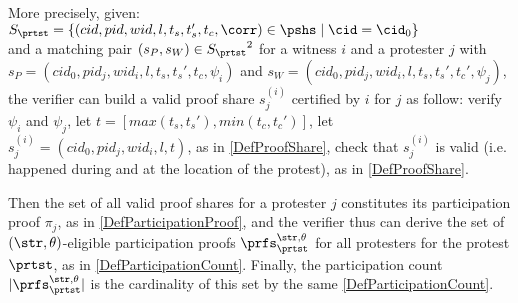 More precisely, given: \\
\(S_{\prtst} = \{ (cid, pid, wid, l, t_s, t_s', t_c, \corr) \in \pshs \mid \cid = \cid_0 \} \) \\
and a matching pair \((s_P, s_W) \in {S_{\prtst}}^2\) for a witness \(i\) and a protester \(j\)
with \(s_P = (cid_0, pid_j, wid_i, l, t_s, t_s', t_c, \psi_i)\)
and  \(s_W = (cid_0, pid_j, wid_i, l, t_s, t_s', t_c', \psi_j)\),
the verifier can build a valid proof share \(s_j^{(i)}\) certified by  \(i\) for \(j\) as follow:
verify \(\psi_i\) and \(\psi_j\),
let \(t = [max(t_s, t_s'), min(t_c, t_c')]\),
let \(s_j^{(i)} = (cid_0, pid_j, wid_i, l, t)\), as in \cref{DefProofShare},
check that \(s_j^{(i)}\) is valid (i.e. happened during and at the location of the protest), as in \cref{DefProofShare}.

Then the set of all valid proof shares for a protester \(j\) constitutes its participation proof \(\pi_{j}\), as in \cref{DefParticipationProof},
and the verifier thus can derive the set of \((\str,\theta)\)-eligible participation proofs \(\prfs_{\prtst}^{\str,\theta}\) for all protesters for the protest \(\prtst\), as in \cref{DefParticipationCount}.
Finally, the  participation count \(|\prfs_{\prtst}^{\str,\theta}|\) is the cardinality of this set by the same \cref{DefParticipationCount}.







